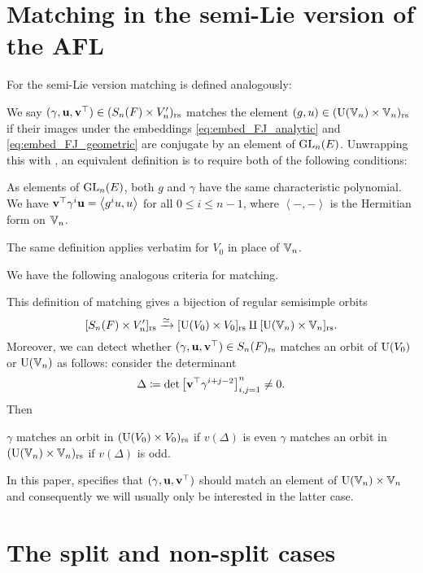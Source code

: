 \section{Matching in the semi-Lie version of the AFL}
For the semi-Lie version matching is defined analogously:
\begin{definition}
  We say $(\gamma, \mathbf u, \mathbf v^\top) \in (S_n(F) \times V_n')_{\mathrm{rs}}$
  matches the element $(g, u) \in (\operatorname{U}(\mathbb V_n) \times \mathbb V_n)_{\mathrm{rs}}$ if
  their images under the embeddings \eqref{eq:embed_FJ_analytic}
  and \eqref{eq:embed_FJ_geometric} are conjugate by an element of $\operatorname{GL}_n(E)$.
  Unwrapping this with ,
  an equivalent definition is to require both of the following conditions:
  \begin{itemize}
    \ii As elements of $\operatorname{GL}_n(E)$,
    both $g$ and $\gamma$ have the same characteristic polynomial.
    \ii We have $\mathbf v^\top \gamma^i \mathbf u = \left< g^i u, u \right>$ for all $0 \le i \le n-1$,
    where $\left< -,- \right>$ is the Hermitian form on $\mathbb V_n$.
  \end{itemize}
  The same definition applies verbatim for $V_0$ in place of $\mathbb V_n$.
  \label{def:matching_semi_lie}
\end{definition}
We have the following analogous criteria for matching.
\begin{proposition}
  \label{prop:valuation_delta_matching_semilie}
  This definition of matching gives
  a bijection of regular semisimple orbits
  \[ [S_n(F) \times V_n']_{\mathrm{rs}} \xrightarrow{\simeq} [\operatorname{U}(V_0) \times V_0]_{\mathrm{rs}} \amalg [\operatorname{U}(\mathbb V_n) \times \mathbb V_n]_{\mathrm{rs}}. \]
  Moreover, we can detect whether ${(\gamma, \mathbf u, \mathbf v^\top)} \in S_n(F)_{\mathrm{rs}}$ matches an orbit of
  $\operatorname{U}(V_0)$ or $\operatorname{U}(\mathbb V_n)$ as follows: consider the determinant
  \[ \Delta \coloneqq \det \left[ \mathbf v^\top \gamma^{i+j-2} \right]_{i,j=1}^n \neq 0. \]
  Then
  \begin{itemize}
    \ii $\gamma$ matches an orbit in $(\operatorname{U}(V_0) \times V_0)_{\mathrm{rs}}$ if $v(\Delta)$ is even
    \ii $\gamma$ matches an orbit in $(\operatorname{U}(\mathbb V_n) \times \mathbb V_n)_{\mathrm{rs}}$ if $v(\Delta)$ is odd.
  \end{itemize}
\end{proposition}
In this paper, 
specifies that ${(\gamma, \mathbf u, \mathbf v^\top)}$ should match an element of $\operatorname{U}(\mathbb V_n) \times \mathbb V_n$
and consequently we will usually only be interested in the latter case.

\section{The split and non-split cases}
